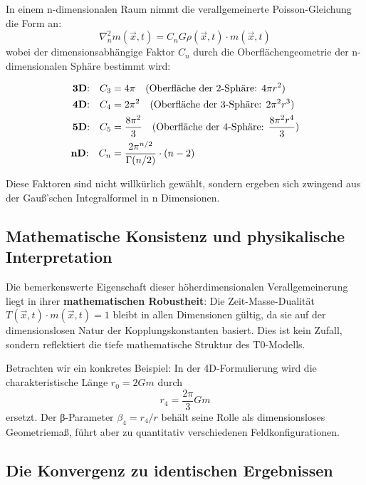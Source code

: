 \documentclass[12pt,a4paper]{report}
\begin{document}
	In einem n-dimensionalen Raum nimmt die verallgemeinerte Poisson-Gleichung die Form an:
	\begin{equation}
		\nabla_n^2 m(\vec{x},t) = C_n G \rho(\vec{x},t) \cdot m(\vec{x},t)
	\end{equation}
	wobei der dimensionsabhängige Faktor $C_n$ durch die Oberflächengeometrie der n-dimensionalen Sphäre bestimmt wird:
	
	\begin{align}
		\text{\textbf{3D}:} \quad C_3 &= 4\pi \quad \text{(Oberfläche der 2-Sphäre: } 4\pi r^2\text{)} \\
		\text{\textbf{4D}:} \quad C_4 &= 2\pi^2 \quad \text{(Oberfläche der 3-Sphäre: } 2\pi^2 r^3\text{)} \\
		\text{\textbf{5D}:} \quad C_5 &= \frac{8\pi^2}{3} \quad \text{(Oberfläche der 4-Sphäre: } \frac{8\pi^2 r^4}{3}\text{)} \\
		\text{\textbf{nD}:} \quad C_n &= \frac{2\pi^{n/2}}{\Gamma(n/2)} \cdot (n-2)
	\end{align}
	
	Diese Faktoren sind nicht willkürlich gewählt, sondern ergeben sich zwingend aus der Gauß'schen Integralformel in n Dimensionen.
	
	\subsection{Mathematische Konsistenz und physikalische Interpretation}
	
	Die bemerkenswerte Eigenschaft dieser höherdimensionalen Verallgemeinerung liegt in ihrer \textbf{mathematischen Robustheit}: Die Zeit-Masse-Dualität $T(\vec{x},t) \cdot m(\vec{x},t) = 1$ bleibt in allen Dimensionen gültig, da sie auf der dimensionslosen Natur der Kopplungskonstanten basiert. Dies ist kein Zufall, sondern reflektiert die tiefe mathematische Struktur des T0-Modells.
	
	Betrachten wir ein konkretes Beispiel: In der 4D-Formulierung wird die charakteristische Länge $r_0 = 2Gm$ durch 
	\begin{equation}
		r_4 = \frac{2\pi}{3}Gm
	\end{equation}
	ersetzt. Der β-Parameter $\beta_4 = r_4/r$ behält seine Rolle als dimensionsloses Geometriemaß, führt aber zu quantitativ verschiedenen Feldkonfigurationen.
	
	\subsection{Die Konvergenz zu identischen Ergebnissen}
	
\end{document}
